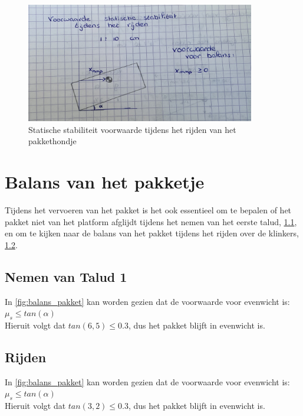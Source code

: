 \begin{figure}[H]
    \centering
    \includegraphics[width = 100mm]{06_Bijlage_H/Dynamische stabiliteit/balans_hoek.jpg}
    \caption{Statische stabiliteit voorwaarde tijdens het rijden van het pakkethondje}
    \label{fig:balans_hoek}
\end{figure}


\section{Balans van het pakketje}
\label{se:Bijlage_H_balanspakket}
Tijdens het vervoeren van het pakket is het ook essentieel om te bepalen of het pakket niet van het platform afglijdt tijdens het nemen van het eerste talud, \cref{se:sub_balans_talud1}, en om te kijken naar de balans van het pakket tijdens het rijden over de klinkers, \cref{se:sub_balans_rijden}.

\subsection{Nemen van Talud 1}
\label{se:sub_balans_talud1}

In \cref{fig:balans_pakket} kan worden gezien dat de voorwaarde voor evenwicht is:\\
$\mu_{s} \leq tan(\alpha) $\\ 
\vspace{\baselineskip}
Hieruit volgt dat $tan(6,5) \leq 0.3$, dus het pakket blijft in evenwicht is.

\subsection{Rijden}
\label{se:sub_balans_rijden}

In \cref{fig:balans_pakket} kan worden gezien dat de voorwaarde voor evenwicht is:\\
$\mu_{s} \leq tan(\alpha) $\\ 
\vspace{\baselineskip}
Hieruit volgt dat $tan(3,2) \leq 0.3$, dus het pakket blijft in evenwicht is.

